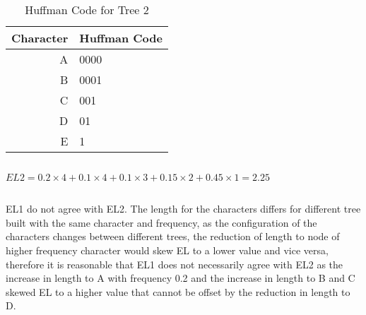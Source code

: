 \documentclass{article}
\begin{document}
\subsection{}
\begin{table}[H]
    \centering
    \begin{tabular}{rl}
            \toprule
            Character&Huffman Code\\
            \midrule
            A&0000\\
            B&0001\\
            C&001\\
            D&01\\
            E&1\\
            \bottomrule
    \end{tabular}
    \caption{Huffman Code for Tree 2}
\end{table}

\subsection{}
$EL2=0.2\times4+0.1\times4+0.1\times3+0.15\times2+0.45\times1=2.25$

\subsection{}
EL1 do not agree with EL2. The length for the characters differs for different tree built with the same character and frequency, as the configuration of the characters changes between different trees, the reduction of length to node of higher frequency character would skew EL to a lower value and vice versa, therefore it is reasonable that EL1 does not necessarily agree with EL2 as the increase in length to A with frequency 0.2 and the increase in length to B and C skewed EL to a higher value that cannot be offset by the reduction in length to D.

\section{}
\end{document}
